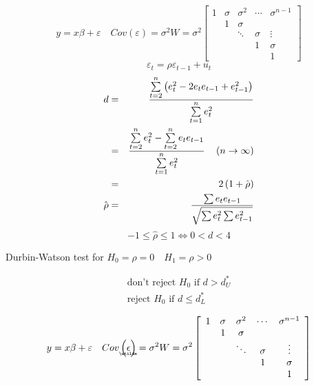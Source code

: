 \documentclass{article}
\begin{document}
\begin{equation*}
y=x\beta +\varepsilon \quad Cov\left( \varepsilon \right) =\sigma
^{2}W=\sigma ^{2}\left[ 
\begin{array}{ccccc}
1 & \sigma  & \sigma ^{2} & \cdots  & \sigma ^{n-1} \\ 
& 1 & \sigma  &  &  \\ 
&  & \ddots  & \sigma  & \vdots  \\ 
&  &  & 1 & \sigma  \\ 
&  &  &  & 1%
\end{array}%
\right] 
\end{equation*}%
\begin{equation*}
\varepsilon _{t}=\rho \varepsilon _{t-1}+u_{t}
\end{equation*}%
\begin{eqnarray*}
d &=&\frac{\tsum\limits_{t=2}^{n}\left(
e_{t}^{2}-2e_{t}e_{t-1}+e_{t-1}^{2}\right) }{\tsum\limits_{t=1}^{n}e_{t}^{2}}
\\
&=&\frac{\tsum\limits_{t=2}^{n}e_{t}^{2}-\tsum\limits_{t=2}^{n}e_{t}e_{t-1}}{%
\tsum\limits_{t=1}^{n}e_{t}^{2}}\quad \left( n\rightarrow \infty \right)  \\
&=&2\left( 1+\hat{\rho}\right)  \\
\hat{\rho} &=&\frac{\tsum e_{t}e_{t-1}}{\sqrt{\sum e_{t}^{2}\sum e_{t-1}^{2}}%
}
\end{eqnarray*}%
\begin{equation*}
-1\leq \hat{\rho}\leq 1\Leftrightarrow 0<d<4
\end{equation*}

\bigskip 

Durbin-Watson test for $H_{0}=\rho =0\quad H_{1}=\rho >0$

\begin{flushright}
\begin{equation*}
\begin{array}{c}
\text{don't reject }H_{0}\text{ if }d>d_{U}^{\ast } \\ 
\text{reject }H_{0}\text{ if }d\leq d_{L}^{\ast }%
\end{array}%
\end{equation*}
\end{flushright}

\begin{equation*}
y=x\beta +\varepsilon \quad Cov\left( 
\underaccent{\wtilde}{\epsilon}%
\right) =\sigma ^{2}W=\sigma ^{2}\left[ 
\begin{array}{ccccc}
1 & \sigma  & \sigma ^{2} & \cdots  & \sigma ^{n-1} \\ 
& 1 & \sigma  &  &  \\ 
&  & \ddots  & \sigma  & \vdots  \\ 
&  &  & 1 & \sigma  \\ 
&  &  &  & 1%
\end{array}%
\right] 
\end{equation*}
\end{document}
